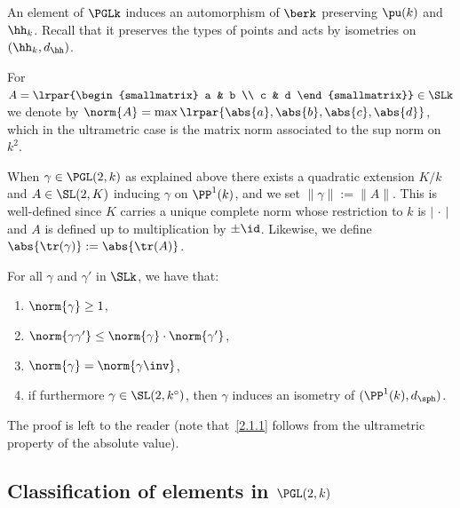 An element of $\PGLk$ induces an automorphism of $\berk$ preserving $\pu(k)$ and $\hh_k$. Recall that it preserves the types of points and acts by isometries on $(\hh_k,d_\hh)$.

For $A = \lrpar{\begin{smallmatrix} a & b \\ c & d
\end{smallmatrix}} \in \SLk$ we denote by
$\norm{A} = \max\lrpar{\abs{a}, \abs{b}, \abs{c}, \abs{d}}$, which in the ultrametric case is the matrix norm associated to the sup norm on $ k^2$.

When $\gamma \in \PGL(2,k)$ as explained above there exists a quadratic extension $K/k$ and $A \in \SL(2,K)$ inducing $\gamma$ on $\PP^1(k)$, and we set $\| \gamma \| := \| A\|$. This is well-defined since $K$ carries a unique complete norm whose restriction to $k$ is $|{\,\cdot\,}|$ and $A$ is defined up to multiplication by $\pm \id$. Likewise, we define $\abs{\tr(\gamma)} := \abs{\tr(A)}$.

\begin{prop}
For all $\gamma$ and $\gamma' $ in $\SLk$, we have that:
\begin{enumerate}%
\item \label{2.1.1} $\norm{\gamma}\geq 1$,
\item \label{2.1.2} $\norm{\gamma \gamma'}\leq \norm{\gamma}\cdot\norm{\gamma'}$,
\item \label{2.1.3} $\norm{\gamma} = \norm{\gamma\inv}$,
\item \label{2.1.4} if furthermore $\gamma\in \SL(2,k^\circ)$, then $\gamma$ induces an isometry of $(\PP^1(k),d_{\sph})$.
\end{enumerate}
\end{prop}

The proof is left to the reader (note that~\eqref{2.1.1} follows from the ultrametric property of the absolute value).


\subsection{Classification of elements in \texorpdfstring{$\PGL(2,k)$}{PGL(2,k)}}


